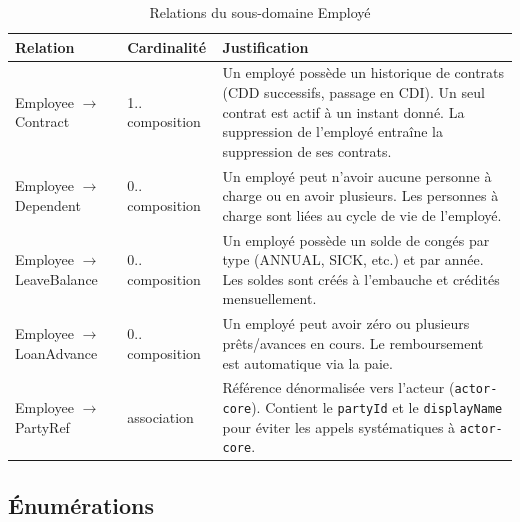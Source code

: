 \documentclass[a4paper,12pt,openany]{book}
\begin{document}
    \begin{table}[H]
        \centering
        \caption{Relations du sous-domaine Employé}
        \label{tab:rel-employee}
        \begin{tabularx}{\textwidth}{llX}
    \toprule
    \textbf{Relation} & \textbf{Cardinalité} & \textbf{Justification} \\
    \midrule
    Employee $\longrightarrow$ Contract & 1..\textasteriskcentered{} composition & Un employé possède un historique de contrats (CDD successifs, passage en CDI). Un seul contrat est actif à un instant donné. La suppression de l'employé entraîne la suppression de ses contrats. \\
    Employee $\longrightarrow$ Dependent & 0..\textasteriskcentered{} composition & Un employé peut n'avoir aucune personne à charge ou en avoir plusieurs. Les personnes à charge sont liées au cycle de vie de l'employé. \\
    Employee $\longrightarrow$ LeaveBalance & 0..\textasteriskcentered{} composition & Un employé possède un solde de congés par type (ANNUAL, SICK, etc.) et par année. Les soldes sont créés à l'embauche et crédités mensuellement. \\
    Employee $\longrightarrow$ LoanAdvance & 0..\textasteriskcentered{} composition & Un employé peut avoir zéro ou plusieurs prêts/avances en cours. Le remboursement est automatique via la paie. \\
    Employee $\longrightarrow$ PartyRef & association & Référence dénormalisée vers l'acteur (\texttt{actor-core}). Contient le \texttt{partyId} et le \texttt{displayName} pour éviter les appels systématiques à \texttt{actor-core}. \\
    \bottomrule
        \end{tabularx}
    \end{table}

    \subsection{Énumérations}
\end{document}
